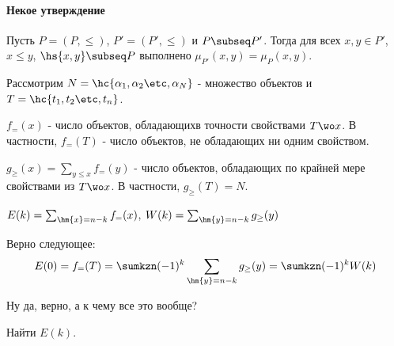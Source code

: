 \documentclass[unicode, 10pt, a4paper, oneside, fleqn]{article}
\begin{document}
\paragraph{Некое утверждение}
Пусть $P=(P,\le)$, $P'=(P',\le)$ и $P\subseq P'$. Тогда для всех $x,y\in P'$, $x\le y$, $\hs{x,y}\subseq P$ выполнено
$\displaystyle \mu_{P'}(x,y)=\mu_{P}(x,y)$.
\begin{ex}
  Рассмотрим $N=\hc{\set{N}}$ - множество объектов и $T=\hc{\set[t]{n}}$.
  \begin{denote}
    $\displaystyle f_=(x)$ - число объектов, обладающихв точности свойствами $T\wo x$. В частности, $f_=(T)$ - число объектов, 
    не обладающих ни одним свойством.
  \end{denote}
  \begin{denote}
    $\displaystyle g_\ge(x) = \sum_{y\le x}f_=(y)$ - число объектов, обладающих по крайней мере свойствами из $T\wo x$. 
    В частности, $g_\ge(T)=N$.
  \end{denote}
  \begin{denotes}
    $E(k) = \sum_{\hm{x}=n-k}f_=(x)$, $W(k)=\sum_{\hm{y}=n-k}g_\ge(y)$
  \end{denotes}
  Верно следующее:
  \begin{displaymath}
    E(0)=f_=(T)=\sumkzn (-1)^k\sum_{\hm{y}=n-k}g_\ge(y)=\sumkzn(-1)^kW(k)
  \end{displaymath}
  \begin{authornote}
    Ну да, верно, а к чему все это вообще?
  \end{authornote}
  \begin{problem}
    Найти $E(k)$.
  \end{problem}
\end{ex}
\end{document}
